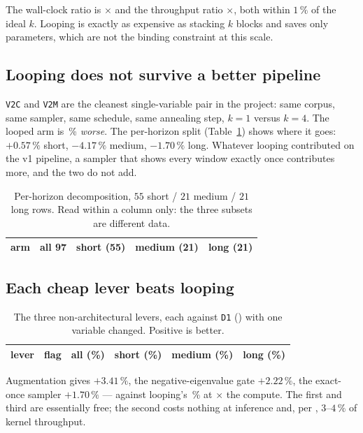 The wall-clock ratio is \CostRatio$\times$ and the throughput ratio
\ThroughputRatio$\times$, both within $1\,\%$ of the ideal $k$. Looping is
exactly as expensive as stacking $k$ blocks and saves only parameters, which
are not the binding constraint at this scale.

\subsection{Looping does not survive a better pipeline}

\texttt{V2C} and \texttt{V2M} are the cleanest single-variable pair in the
project: same corpus, same sampler, same schedule, same annealing step, $k=1$
versus $k=4$. The looped arm is \VtwoLoopPenalty\,\% \emph{worse}. The
per-horizon split (Table~\ref{tab:perterm}) shows where it goes: $+0.57\,\%$
short, $-4.17\,\%$ medium, $-1.70\,\%$ long. Whatever looping contributed on
the v1 pipeline, a sampler that shows every window exactly once contributes
more, and the two do not add.

\begin{table}[htbp]
  \centering\small
  \caption{Per-horizon decomposition, $55$ short / $21$ medium / $21$ long
  rows. Read within a column only: the three subsets are different data.}
  \label{tab:perterm}
  \begin{tabular}{lrrrr}
    \toprule
    arm & all 97 & short (55) & medium (21) & long (21) \\
    \midrule
    
  \end{tabular}
\end{table}

\subsection{Each cheap lever beats looping}

\begin{table}[htbp]
  \centering\small
  \caption{The three non-architectural levers, each against \texttt{D1}
  (\DOneMase) with one variable changed. Positive is better.}
  \label{tab:levers}
  \begin{tabular}{llrrrr}
    \toprule
    lever & flag & all (\%) & short (\%) & medium (\%) & long (\%) \\
    \midrule
    
  \end{tabular}
\end{table}

Augmentation gives $+3.41\,\%$, the negative-eigenvalue gate $+2.22\,\%$, the
exact-once sampler $+1.70\,\%$ --- against looping's \LoopGain\,\% at
\CostRatio$\times$ the compute. The first and third are essentially free; the
second costs nothing at inference and, per \citet{ckda2026}, $3$--$4\,\%$ of
kernel throughput.


